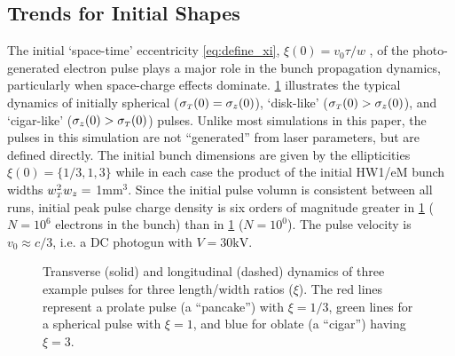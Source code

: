 \subsection{Trends for Initial Shapes}

The initial `space-time' eccentricity \ref{eq:define_xi}, $\xi ( 0 ) = v_{{ \scriptscriptstyle 0}} \tau / w $ , of the photo-generated electron pulse plays a major role in the bunch propagation dynamics, particularly when space-charge effects dominate.
\ref{fig:compare_shape} illustrates the typical dynamics of initially spherical ($ \sigma_{ {\scriptscriptstyle T} }(0) = \sigma_{z} ( 0 ) $), `disk-like' ($ \sigma_{ {\scriptscriptstyle T} } ( 0 ) > \sigma_{ z } ( 0 ) $), and `cigar-like' ($ \sigma_{ z } ( 0 ) > \sigma_{ {\scriptscriptstyle T} } ( 0 ) $) pulses.
Unlike most simulations in this paper, the pulses in this simulation are not ``generated'' from laser parameters, but are defined directly.
The initial bunch dimensions are given by the ellipticities $ \xi(0) = \{ 1/3 , 1 , 3 \} $ while in each case the product of the initial HW1/eM bunch widths $w_{{\scriptscriptstyle T}}^2 w_z = $ 1mm$^3$.
Since the initial pulse volumn is consistent between all runs, initial peak pulse charge density is six orders of magnitude greater in \ref{fig:compare_shape} ($ N = 10^{6} $ electrons in the bunch) than in \ref{fig:compare_shape} ($ N = 10^{0} $).
The pulse velocity is $ v_{{ \scriptscriptstyle 0}} \approx c/3 $, i.e. a DC photogun with $V = 30\text{kV} $.

\begin{figure}
  \centering
  
  \caption{
    Transverse (solid) and longitudinal (dashed) dynamics of three example pulses for three length/width ratios ($\xi$). 
    The red lines represent a prolate pulse (a ``pancake'') with $\xi=1/3$, green lines for a spherical pulse with $\xi=1$, and blue for oblate (a ``cigar'') having $\xi=3$.
  }
  \label{fig:compare_shape}
\end{figure}

%
%

